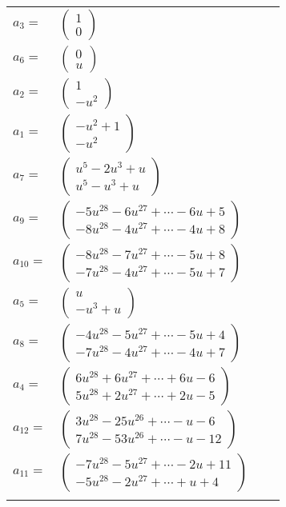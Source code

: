 \documentclass[1p]{elsarticle_modified}
\theoremstyle{definition}
\begin{document}
\begin{tabular}{m{7pt} m{180pt} m{7pt} m{180pt} }
\flushright $a_{3}=$&$\begin{pmatrix}1\\0\end{pmatrix}$ \\
\flushright $a_{6}=$&$\begin{pmatrix}0\\u\end{pmatrix}$ \\
\flushright $a_{2}=$&$\begin{pmatrix}1\\- u^2\end{pmatrix}$ \\
\flushright $a_{1}=$&$\begin{pmatrix}- u^2+1\\- u^2\end{pmatrix}$ \\
\flushright $a_{7}=$&$\begin{pmatrix}u^5-2 u^3+u\\u^5- u^3+u\end{pmatrix}$ \\
\flushright $a_{9}=$&$\begin{pmatrix}-5 u^{28}-6 u^{27}+\cdots-6 u+5\\-8 u^{28}-4 u^{27}+\cdots-4 u+8\end{pmatrix}$ \\
\flushright $a_{10}=$&$\begin{pmatrix}-8 u^{28}-7 u^{27}+\cdots-5 u+8\\-7 u^{28}-4 u^{27}+\cdots-5 u+7\end{pmatrix}$ \\
\flushright $a_{5}=$&$\begin{pmatrix}u\\- u^3+u\end{pmatrix}$ \\
\flushright $a_{8}=$&$\begin{pmatrix}-4 u^{28}-5 u^{27}+\cdots-5 u+4\\-7 u^{28}-4 u^{27}+\cdots-4 u+7\end{pmatrix}$ \\
\flushright $a_{4}=$&$\begin{pmatrix}6 u^{28}+6 u^{27}+\cdots+6 u-6\\5 u^{28}+2 u^{27}+\cdots+2 u-5\end{pmatrix}$ \\
\flushright $a_{12}=$&$\begin{pmatrix}3 u^{28}-25 u^{26}+\cdots- u-6\\7 u^{28}-53 u^{26}+\cdots- u-12\end{pmatrix}$ \\
\flushright $a_{11}=$&$\begin{pmatrix}-7 u^{28}-5 u^{27}+\cdots-2 u+11\\-5 u^{28}-2 u^{27}+\cdots+u+4\end{pmatrix}$\\&\end{tabular}
\end{document}
